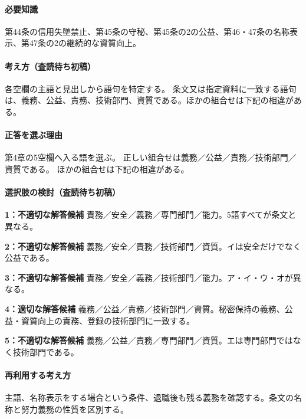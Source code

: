 \paragraph{必要知識} 第44条の信用失墜禁止、第45条の守秘、第45条の2の公益、第46・47条の名称表示、第47条の2の継続的な資質向上。

\paragraph{考え方（査読待ち初稿）} 各空欄の主語と見出しから語句を特定する。 条文又は指定資料に一致する語句は、義務、公益、責務、技術部門、資質である。ほかの組合せは下記の相違がある。

\paragraph{正答を選ぶ理由} 第4章の5空欄へ入る語を選ぶ。 正しい組合せは義務／公益／責務／技術部門／資質である。 ほかの組合せは下記の相違がある。

\paragraph{選択肢の検討（査読待ち初稿）}\mbox{}\par

\noindent\textbf{1：不適切な解答候補} 責務／安全／義務／専門部門／能力。5語すべてが条文と異なる。\par

\noindent\textbf{2：不適切な解答候補} 義務／安全／責務／技術部門／資質。イは安全だけでなく公益である。\par

\noindent\textbf{3：不適切な解答候補} 責務／安全／義務／技術部門／能力。ア・イ・ウ・オが異なる。\par

\noindent\textbf{4：適切な解答候補} 義務／公益／責務／技術部門／資質。秘密保持の義務、公益・資質向上の責務、登録の技術部門に一致する。\par

\noindent\textbf{5：不適切な解答候補} 義務／公益／責務／専門部門／資質。エは専門部門ではなく技術部門である。\par

\paragraph{再利用する考え方} 主語、名称表示をする場合という条件、退職後も残る義務を確認する。条文の名称と努力義務の性質を区別する。

